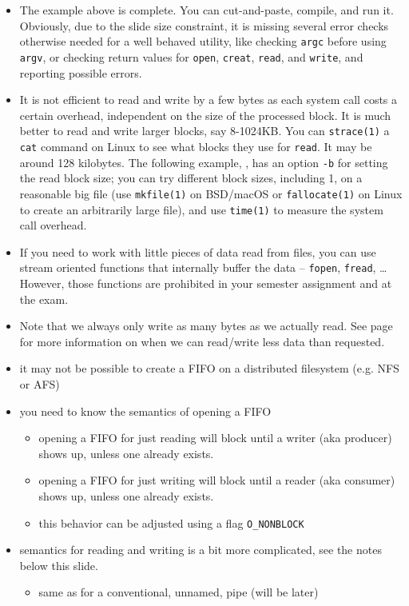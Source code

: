 \begin{itemize}
\item The example above is complete.  You can cut-and-paste, compile, and run
it.  Obviously, due to the slide size constraint, it is missing several error
checks otherwise needed for a well behaved utility, like checking \texttt{argc}
before using \texttt{argv}, or checking return values for \texttt{open},
\texttt{creat}, \texttt{read}, and \texttt{write}, and reporting possible
errors.
\item It is not efficient to read and write by a few bytes as each system call
costs a certain overhead, independent on the size of the processed block.  It is
much better to read and write larger blocks, say 8-1024KB.  You can
\texttt{strace(1)} a \texttt{cat} command on Linux to see what blocks they use
for \texttt{read}.  It may be around 128 kilobytes.  The following example,
, has an option \texttt{-b} for setting the read block size;
you can try different block sizes, including 1, on a reasonable big file (use
\texttt{mkfile(1)} on BSD/macOS or \texttt{fallocate(1)} on Linux to create an
arbitrarily large file), and use \texttt{time(1)} to measure the system call
overhead.
\item If you need to work with little pieces of data read from files, you can
use stream oriented functions that internally buffer the data -- \texttt{fopen},
\texttt{fread}, \dots  However, those functions are prohibited in your semester
assignment and at the exam.
\item Note that we always only write as many bytes as we actually read.  See
page \pageref{READCALL} for more information on when we can read/write less data
than requested.
\end{itemize}

\begin{slide}

\begin{itemize}
\item it may not be possible to create a FIFO on a distributed filesystem (e.g.
NFS or AFS)
\item you need to know the semantics of opening a FIFO
  \begin{itemize}
  \item opening a FIFO for just reading will block until a writer (aka producer)
  shows up, unless one already exists.
  \item opening a FIFO for just writing will block until a reader (aka consumer)
  shows up, unless one already exists.
  \item this behavior can be adjusted using a flag \texttt{O\_NONBLOCK}
  \end{itemize}
\item semantics for reading and writing is a bit more complicated, see
the notes below this slide.
  \begin{itemize}
  \item same as for a conventional, unnamed, pipe (will be later)
  \end{itemize}
\end{itemize}
\end{slide}

